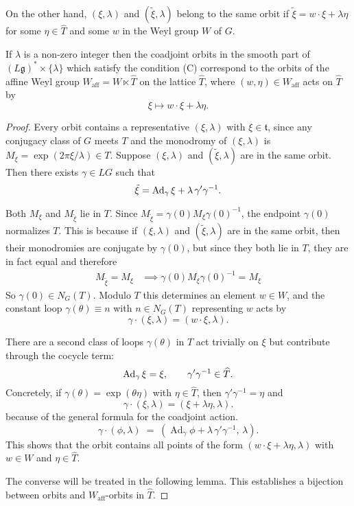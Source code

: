 \documentclass[12pt]{article}
\begin{document}
On the other hand, $(\xi,\lambda)$ and $(\tilde{\xi},\lambda)$ belong to the same orbit if  $\tilde{\xi} = w \cdot \xi + \lambda \eta$ for some $\eta \in \hat{T}$ and some $w$ in the Weyl group $W$ of $G$.

\begin{proposition}
    If $\lambda$ is a non-zero integer then the coadjoint orbits in the smooth part of
    $(L\mathfrak{g})^* \times \{\lambda\}$ which satisfy the condition (C) correspond
    to the orbits of the affine Weyl group
    $W_{\mathrm{aff}} = W \ltimes \hat{T}$ on the lattice $\hat{T}$, where
    $(w,\eta) \in W_{\mathrm{aff}}$ acts on $\hat{T}$ by
    \[
        \xi \mapsto w \cdot \xi + \lambda \eta.
    \]
\end{proposition}

\begin{proof}
    Every orbit contains a representative $(\xi,\lambda)$ with $\xi\in\mathfrak t$,
    since any conjugacy class of $G$ meets $T$ and the monodromy of $(\xi,\lambda)$
    is $M_\xi = \exp(2\pi \xi/\lambda)\in T$.
    Suppose $(\xi,\lambda)$ and $(\tilde\xi,\lambda)$ are in the same orbit.
    Then there exists $\gamma\in LG$ such that
    \[
        \tilde\xi = \operatorname{Ad}_\gamma\xi + \lambda\,\gamma'\gamma^{-1}.
    \]

    Both $M_\xi$ and $M_{\tilde\xi}$ lie in $T$. Since
    $M_{\tilde\xi}=\gamma(0)M_\xi\gamma(0)^{-1}$, the endpoint $\gamma(0)$ normalizes $T$.
    This is because if $(\xi,\lambda)$ and $(\tilde\xi,\lambda)$ are in the same orbit, then their monodromies are conjugate by $\gamma(0)$, but since they both lie in $T$, they are in fact equal and therefore \begin{align*}
        M_{\tilde\xi} = M_\xi & \implies \gamma(0)M_\xi\gamma(0)^{-1} = M_\xi
    \end{align*}
    So $\gamma(0)\in N_G(T)$. Modulo $T$ this determines an element $w\in W$, and the
    constant loop $\gamma(\theta)\equiv n$ with $n\in N_G(T)$ representing $w$ acts by
    \[
        \gamma\cdot(\xi,\lambda) = (w\cdot\xi,\lambda).
    \]

    There are a second class of loops $\gamma(\theta)$ in $T$ act trivially on $\xi$ but contribute through the cocycle term:
    \[
        \operatorname{Ad}_\gamma \xi = \xi, \qquad \gamma'\gamma^{-1}\in \widehat T.
    \]
    Concretely, if $\gamma(\theta)=\exp(\theta\eta)$ with $\eta\in\widehat T$,
    then $\gamma'\gamma^{-1}=\eta$ and
    \[
        \gamma\cdot(\xi,\lambda) = (\xi+\lambda\eta,\lambda).
    \]
    because of the general formula for the coadjoint action. \[
        \gamma\cdot(\phi,\lambda) \;=\; (\operatorname{Ad}_\gamma\phi + \lambda\,\gamma'\gamma^{-1},\,\lambda).
    \]
This shows that the orbit contains all points of the form
    $(w\cdot\xi+\lambda\eta,\lambda)$ with $w\in W$ and $\eta\in\widehat T$.

The converse will be treated in the following lemma. This establishes a bijection between orbits and $W_{\mathrm{aff}}$-orbits
    in $\hat{T}$.
\end{proof}
\end{document}
